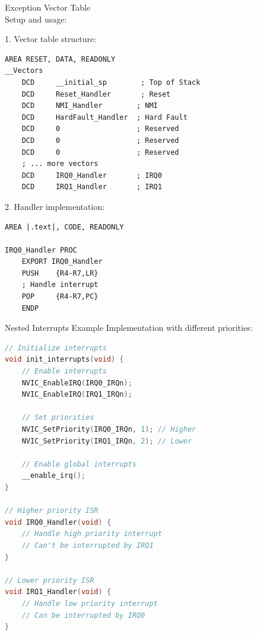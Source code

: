 \begin{KR}{Exception Vector Table}\\
Setup and usage:

1. Vector table structure:
\begin{lstlisting}[language=armasm, style=base]
    AREA RESET, DATA, READONLY
__Vectors
    DCD     __initial_sp        ; Top of Stack
    DCD     Reset_Handler       ; Reset
    DCD     NMI_Handler        ; NMI
    DCD     HardFault_Handler  ; Hard Fault
    DCD     0                  ; Reserved
    DCD     0                  ; Reserved
    DCD     0                  ; Reserved
    ; ... more vectors
    DCD     IRQ0_Handler       ; IRQ0
    DCD     IRQ1_Handler       ; IRQ1
\end{lstlisting}

2. Handler implementation:
\begin{lstlisting}[language=armasm, style=base]
    AREA |.text|, CODE, READONLY
    
IRQ0_Handler PROC
    EXPORT IRQ0_Handler
    PUSH    {R4-R7,LR}
    ; Handle interrupt
    POP     {R4-R7,PC}
    ENDP
\end{lstlisting}
\end{KR}

\begin{example2}{Nested Interrupts Example}
Implementation with different priorities:
\begin{lstlisting}[language=C, style=base]
// Initialize interrupts
void init_interrupts(void) {
    // Enable interrupts
    NVIC_EnableIRQ(IRQ0_IRQn);
    NVIC_EnableIRQ(IRQ1_IRQn);
    
    // Set priorities
    NVIC_SetPriority(IRQ0_IRQn, 1); // Higher
    NVIC_SetPriority(IRQ1_IRQn, 2); // Lower
    
    // Enable global interrupts
    __enable_irq();
}

// Higher priority ISR
void IRQ0_Handler(void) {
    // Handle high priority interrupt
    // Can't be interrupted by IRQ1
}

// Lower priority ISR
void IRQ1_Handler(void) {
    // Handle low priority interrupt
    // Can be interrupted by IRQ0
}
\end{lstlisting}
\end{example2}

